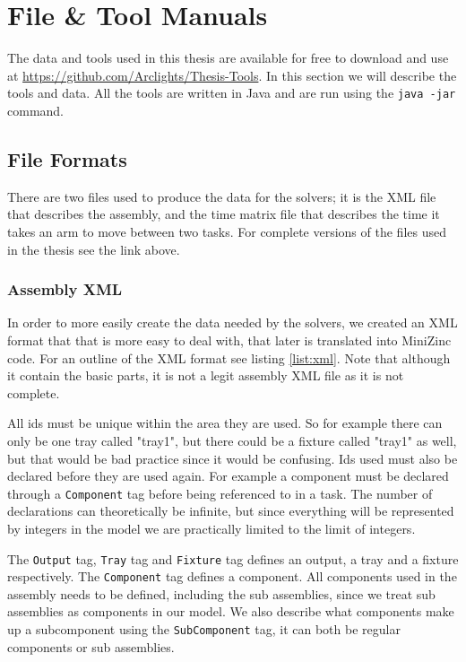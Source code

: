 \chapter{File \& Tool Manuals}\label{app:tool_manuals}
The data and tools used in this thesis are available for free to download and use at \url{https://github.com/Arclights/Thesis-Tools}. In this section we will describe the tools and data. All the tools are written in Java and are run using the \texttt{java -jar} command.

\section{File Formats}
There are two files used to produce the data for the solvers; it is the XML file that describes the assembly, and the time matrix file that describes the time it takes an arm to move between two tasks. For complete versions of the files used in the thesis see the link above.
\subsection{Assembly XML}\label{sec:xml}
In order to more easily create the data needed by the solvers, we created an XML format that that is more easy to deal with, that later is translated into MiniZinc code. For an outline of the XML format see listing \ref{list:xml}. Note that although it contain the basic parts, it is not a legit assembly XML file as it is not complete.

All ids must be unique within the area they are used. So for example there can only be one tray called "tray1", but there could be a fixture called "tray1" as well, but that would be bad practice since it would be confusing. Ids used must also be declared before they are used again. For example a component must be declared through a \texttt{Component} tag before being referenced to in a task. The number of declarations can theoretically be infinite, but since everything will be represented by integers in the model we are practically limited to the limit of integers.

The \texttt{Output} tag, \texttt{Tray} tag and \texttt{Fixture} tag defines an output, a tray and a fixture respectively. The \texttt{Component} tag defines a component. All components used in the assembly needs to be defined, including the sub assemblies, since we treat sub assemblies as components in our model. We also describe what components make up a subcomponent using the \texttt{SubComponent} tag, it can both be regular components or sub assemblies.

